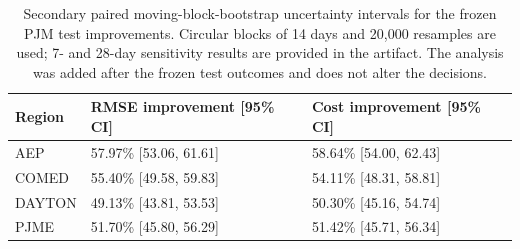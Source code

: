 \begin{table}[htbp]
\centering
\caption{Secondary paired moving-block-bootstrap uncertainty intervals for the frozen PJM test improvements. Circular blocks of 14 days and 20,000 resamples are used; 7- and 28-day sensitivity results are provided in the artifact. The analysis was added after the frozen test outcomes and does not alter the decisions.}
\label{tab:pjm_bootstrap_ci}
\footnotesize
\setlength{\tabcolsep}{3pt}
\begin{tabular}{lll}
\toprule
Region & RMSE improvement [95\% CI] & Cost improvement [95\% CI] \\
\midrule
AEP & 57.97\% [53.06, 61.61] & 58.64\% [54.00, 62.43] \\
COMED & 55.40\% [49.58, 59.83] & 54.11\% [48.31, 58.81] \\
DAYTON & 49.13\% [43.81, 53.53] & 50.30\% [45.16, 54.74] \\
PJME & 51.70\% [45.80, 56.29] & 51.42\% [45.71, 56.34] \\
\bottomrule
\end{tabular}
\end{table}
